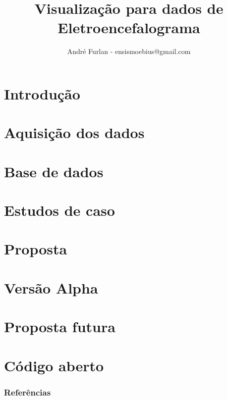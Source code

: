 

\title{Visualização para dados de Eletroencefalograma}


\author{André Furlan - ensismoebius@gmail.com}

\date{\the\year}


	
	\frame{\titlepage}
	
	\section{Introdução}
		
	\section{Aquisição dos dados}
		
	\section{Base de dados}
		
	\section{Estudos de caso}
		
	\section{Proposta}
		
	\section{Versão Alpha}
	\section{Proposta futura}
		
	\section{Código aberto}
		
	
	\begin{frame}[allowframebreaks]
		\frametitle{Referências}
		
	\end{frame}
	
